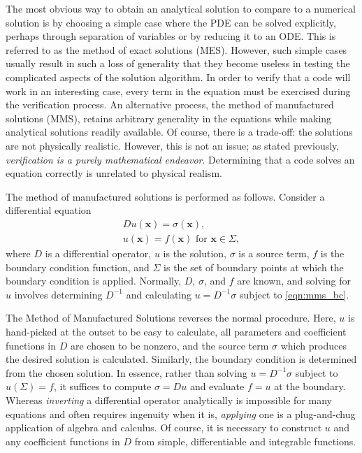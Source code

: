 \documentclass[ms,cpyr,lof,lot]{uathesis}
\renewcommand\vec\bm
\begin{document}
The most obvious way to obtain an analytical solution to compare to a numerical solution is by choosing a simple case where the PDE can be solved explicitly, perhaps through separation of variables or by reducing it to an ODE.
This is referred to as the method of exact solutions (MES).
However, such simple cases usually result in such a loss of generality that they become useless in testing the complicated aspects of the solution algorithm.
In order to verify that a code will work in an interesting case, every term in the equation must be exercised during the verification process.
An alternative process, the method of manufactured solutions (MMS), retains arbitrary generality in the equations while making analytical solutions readily available.
Of course, there is a trade-off: the solutions are not physically realistic.
However, this is not an issue; as stated previously, \textit{verification is a purely mathematical endeavor}.
Determining that a code solves an equation correctly is unrelated to physical realism.

The method of manufactured solutions is performed as follows.
Consider a differential equation
\begin{align}
  Du(\vec{x}) = \sigma(\vec{x}), \label{eqn:mms_de} \\
  u(\vec{x})=f(\vec{x}) \mbox{ for } \vec{x} \in \Sigma,
  \label{eqn:mms_bc}
\end{align}
where $D$ is a differential operator, $u$ is the solution, $\sigma$ is a source term, $f$ is the boundary condition function, and $\Sigma$ is the set of boundary points at which the boundary condition is applied.
Normally, $D$, $\sigma$, and $f$ are known, and solving for $u$ involves determining $D^{-1}$ and calculating $u = D^{-1}\sigma$ subject to \eqref{eqn:mms_bc}.

The Method of Manufactured Solutions reverses the normal procedure.
Here, $u$ is hand-picked at the outset to be easy to calculate, all parameters and coefficient functions in $D$ are chosen to be nonzero, and the source term $\sigma$ which produces the desired solution is calculated.
Similarly, the boundary condition is determined from the chosen solution.
In essence, rather than solving $u = D^{-1}\sigma$ subject to $u(\Sigma)=f$, it suffices to compute $\sigma = Du$ and evaluate $f=u$ at the boundary.
Whereas \textit{inverting} a differential operator analytically is impossible for many equations and often requires ingenuity when it is, \textit{applying} one is a plug-and-chug application of algebra and calculus.
Of course, it is necessary to construct $u$ and any coefficient functions in $D$ from simple, differentiable and integrable functions.
\end{document}
